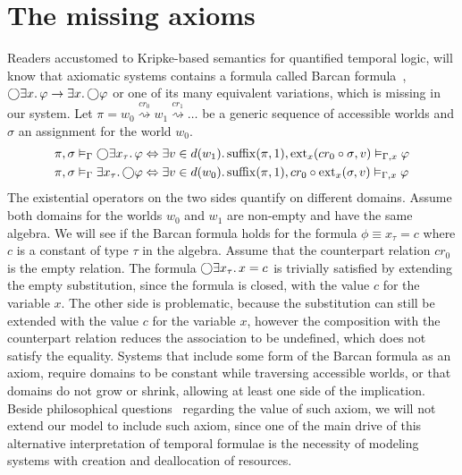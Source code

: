 \section{The missing axioms}
Readers accustomed to Kripke-based semantics for quantified temporal logic, will know that axiomatic systems contains a
formula called Barcan formula~\cite{barcan_functional_1946}, $\bigcirc{\exists {x} \ldotp {\varphi}} \to \exists {x} \ldotp {\bigcirc{\varphi}}$
or one of its many equivalent variations, which is missing in our system.  Let $\pi = w_0
\overset{cr_0}{\rightsquigarrow} w_1 \overset{cr_1}{\rightsquigarrow} \ldots$ be a generic sequence of accessible worlds
and $\sigma$ an assignment for the world $w_0$.
\begin{align*}
  {\pi}, {\sigma} \vDash_{\Gamma} {\bigcirc{\exists {x_\tau} \ldotp {\varphi}}}
    &\Leftrightarrow \exists {v \in d(w_1)} \ldotp {{\operatorname{suffix}(\pi, 1)}, {\operatorname{ext}_{x}({cr_0 \circ \sigma},{v})} \vDash_{\Gamma,x} {\varphi}} \\
  {\pi}, {\sigma} \vDash_{\Gamma} {\exists {x_\tau} \ldotp {\bigcirc{\varphi}}}
    &\Leftrightarrow \exists {v \in d(w_0)} \ldotp {{\operatorname{suffix}(\pi, 1)}, {cr_0 \circ \operatorname{ext}_{x}({\sigma},{v})} \vDash_{\Gamma,x} {\varphi}}
\end{align*}
The existential operators on the two sides quantify on different domains. 
Assume both domains for the worlds $w_0$ and $w_1$ are non-empty and have the same algebra. We will see if the Barcan
formula holds for the formula $\phi \equiv x_\tau = c$ where $c$ is a constant of type $\tau$ in the algebra.  Assume
that the counterpart relation $cr_0$ is the empty relation. The formula $\bigcirc{\exists {x_\tau} \ldotp {x = c}}$ is trivially
satisfied by extending the empty substitution, since the formula is closed, with the value $c$ for the variable $x$. The
other side is problematic, because the substitution can still be extended with the value $c$ for the variable $x$,
however the composition with the counterpart relation reduces the association to be undefined, which does not satisfy
the equality. Systems that include some form of the Barcan formula as an axiom, require domains to be constant while
traversing accessible worlds, or that domains do not grow or shrink, allowing at least one side of the implication.
Beside philosophical questions~\cite{williamson_modal_2015} regarding the value of such axiom, we will not extend our
model to include such axiom, since one of the main drive of this alternative interpretation of temporal formulae is the
necessity of modeling systems with creation and deallocation of resources.

